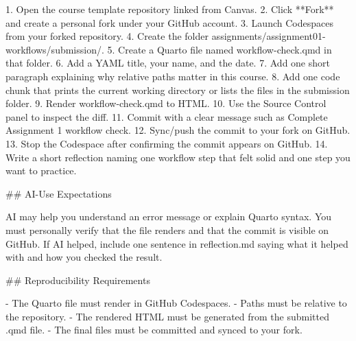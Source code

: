 \documentclass[
  letterpaper,
  DIV=11,
  numbers=noendperiod,
  oneside]{scrreprt}
\newenvironment{Shaded}{\begin{snugshade}}{\end{snugshade}}
\newcommand{\FunctionTok}[1]{\textcolor[rgb]{0.28,0.35,0.67}{#1}}
\newcommand{\InformationTok}[1]{\textcolor[rgb]{0.37,0.37,0.37}{#1}}
\newcommand{\NormalTok}[1]{\textcolor[rgb]{0.00,0.23,0.31}{#1}}
\newcommand{\SpecialStringTok}[1]{\textcolor[rgb]{0.13,0.47,0.30}{#1}}
\begin{document}
\begin{Shaded}
\begin{Highlighting}[numbers=left,,]
\SpecialStringTok{1. }\NormalTok{Open the course template repository linked from Canvas.}
\SpecialStringTok{2. }\NormalTok{Click **Fork** and create a personal fork under your GitHub account.}
\SpecialStringTok{3. }\NormalTok{Launch Codespaces from your forked repository.}
\SpecialStringTok{4. }\NormalTok{Create the folder }\InformationTok{\textasciigrave{}assignments/assignment01{-}workflows/submission/\textasciigrave{}}\NormalTok{.}
\SpecialStringTok{5. }\NormalTok{Create a Quarto file named }\InformationTok{\textasciigrave{}workflow{-}check.qmd\textasciigrave{}}\NormalTok{ in that folder.}
\SpecialStringTok{6. }\NormalTok{Add a YAML title, your name, and the date.}
\SpecialStringTok{7. }\NormalTok{Add one short paragraph explaining why relative paths matter in this course.}
\SpecialStringTok{8. }\NormalTok{Add one code chunk that prints the current working directory or lists the files in the submission folder.}
\SpecialStringTok{9. }\NormalTok{Render }\InformationTok{\textasciigrave{}workflow{-}check.qmd\textasciigrave{}}\NormalTok{ to HTML.}
\SpecialStringTok{10. }\NormalTok{Use the Source Control panel to inspect the diff.}
\SpecialStringTok{11. }\NormalTok{Commit with a clear message such as }\InformationTok{\textasciigrave{}Complete Assignment 1 workflow check\textasciigrave{}}\NormalTok{.}
\SpecialStringTok{12. }\NormalTok{Sync/push the commit to your fork on GitHub.}
\SpecialStringTok{13. }\NormalTok{Stop the Codespace after confirming the commit appears on GitHub.}
\SpecialStringTok{14. }\NormalTok{Write a short reflection naming one workflow step that felt solid and one step you want to practice.}

\FunctionTok{\#\# AI{-}Use Expectations}

\NormalTok{AI may help you understand an error message or explain Quarto syntax. You must personally verify that the file renders and that the commit is visible on GitHub. If AI helped, include one sentence in }\InformationTok{\textasciigrave{}reflection.md\textasciigrave{}}\NormalTok{ saying what it helped with and how you checked the result.}

\FunctionTok{\#\# Reproducibility Requirements}

\SpecialStringTok{{-} }\NormalTok{The Quarto file must render in GitHub Codespaces.}
\SpecialStringTok{{-} }\NormalTok{Paths must be relative to the repository.}
\SpecialStringTok{{-} }\NormalTok{The rendered HTML must be generated from the submitted }\InformationTok{\textasciigrave{}.qmd\textasciigrave{}}\NormalTok{ file.}
\SpecialStringTok{{-} }\NormalTok{The final files must be committed and synced to your fork.}


\end{Highlighting}
\end{Shaded}
\end{document}
